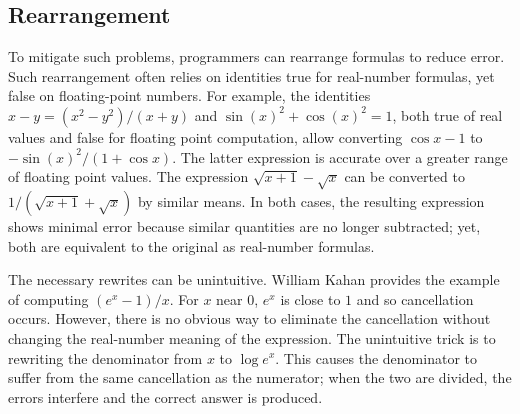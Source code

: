 \documentclass[paper.tex]{subfiles}
\begin{document}
\subsection{Rearrangement}

To mitigate such problems, programmers can rearrange formulas to
reduce error.  Such rearrangement often relies on identities true for
real-number formulas, yet false on floating-point numbers.  For
example, the identities $x - y = (x^2 - y^2) / (x + y)$ and $\sin(x)^2
+ \cos(x)^2 = 1$, both true of real values and false for floating
point computation, allow converting $\cos x - 1$ to $- \sin(x)^2 / (1
+ \cos x)$.  The latter expression is accurate over a greater range of
floating point values.  The expression $\sqrt{x+1} - \sqrt{x}$ can be
converted to $1 / (\sqrt{x+1} + \sqrt{x})$ by similar means.  In both
cases, the resulting expression shows minimal error because similar
quantities are no longer subtracted; yet, both are equivalent to the
original as real-number formulas.

The necessary rewrites can be unintuitive.  William Kahan provides the
example~\cite{} of computing $(e^x - 1) / x$.  For $x$ near $0$, $e^x$
is close to $1$ and so cancellation occurs.  However, there is no
obvious way to eliminate the cancellation without changing the
real-number meaning of the expression.  The unintuitive trick is to
rewriting the denominator from $x$ to $\log e^x$.  This causes the
denominator to suffer from the same cancellation as the numerator;
when the two are divided, the errors interfere and the correct answer
is produced.
\end{document}
